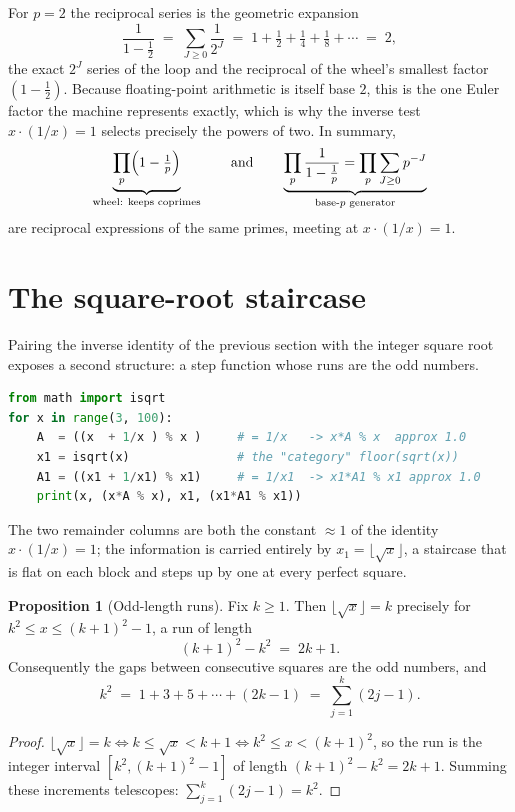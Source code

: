\documentclass[11pt]{article}
\theoremstyle{definition}
\newtheorem{proposition}{Proposition}
\begin{document}
\noindent For $p=2$ the reciprocal series is the geometric expansion
\[
  \frac{1}{1-\tfrac12} \;=\; \sum_{J\ge 0}\frac{1}{2^{J}}
  \;=\; 1+\tfrac12+\tfrac14+\tfrac18+\cdots \;=\; 2,
\]
the exact $2^{J}$ series of the loop and the reciprocal of the wheel's smallest
factor $(1-\tfrac12)$. Because floating-point arithmetic is itself base $2$, this
is the one Euler factor the machine represents exactly, which is why the
inverse test $x\cdot(1/x)=1$ selects precisely the powers of two. In summary,
\[
  \underbrace{\prod_p\Bigl(1-\tfrac1p\Bigr)}_{\text{wheel: keeps coprimes}}
  \qquad\text{and}\qquad
  \underbrace{\prod_p \frac{1}{1-\tfrac1p}=\prod_p\sum_{J\ge0}p^{-J}}_{\text{base-}p\text{ generator}}
\]
are reciprocal expressions of the same primes, meeting at $x\cdot(1/x)=1$.

\section{The square-root staircase}

Pairing the inverse identity of the previous section with the integer square
root exposes a second structure: a step function whose runs are the odd numbers.

\begin{lstlisting}[language=Python]
from math import isqrt
for x in range(3, 100):
    A  = ((x  + 1/x ) % x )     # = 1/x   -> x*A % x  approx 1.0
    x1 = isqrt(x)               # the "category" floor(sqrt(x))
    A1 = ((x1 + 1/x1) % x1)     # = 1/x1  -> x1*A1 % x1 approx 1.0
    print(x, (x*A % x), x1, (x1*A1 % x1))
\end{lstlisting}

The two remainder columns are both the constant $\approx 1$ of the identity
$x\cdot(1/x)=1$; the information is carried entirely by $x_1=\lfloor\sqrt x\rfloor$,
a staircase that is flat on each block and steps up by one at every perfect
square.

\begin{proposition}[Odd-length runs]
Fix $k\ge 1$. Then $\lfloor\sqrt x\rfloor = k$ precisely for
$k^{2}\le x \le (k+1)^{2}-1$, a run of length
\[
  (k+1)^{2}-k^{2} \;=\; 2k+1 .
\]
Consequently the gaps between consecutive squares are the odd numbers, and
\[
  k^{2} \;=\; 1+3+5+\cdots+(2k-1) \;=\; \sum_{j=1}^{k}(2j-1).
\]
\end{proposition}

\begin{proof}
$\lfloor\sqrt x\rfloor = k \iff k \le \sqrt x < k+1 \iff k^{2}\le x <(k+1)^{2}$,
so the run is the integer interval $[k^{2},(k+1)^{2}-1]$ of length
$(k+1)^{2}-k^{2}=2k+1$. Summing these increments telescopes:
$\sum_{j=1}^{k}(2j-1)=k^{2}$.
\end{proof}
\end{document}
